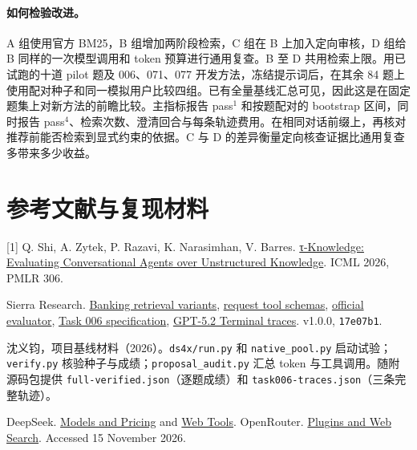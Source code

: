 \documentclass{article}
\begin{document}
\paragraph{如何检验改进。} A 组使用官方 BM25，B 组增加两阶段检索，C 组在 B 上加入定向审核，D 组给 B 同样的一次模型调用和 token 预算进行通用复查。B 至 D 共用检索上限。用已试跑的十道 pilot 题及 006、071、077 开发方法，冻结提示词后，在其余 84 题上使用配对种子和同一模拟用户比较四组。已有全量基线汇总可见，因此这是在固定题集上对新方法的前瞻比较。主指标报告 pass$^1$ 和按题配对的 bootstrap 区间，同时报告 pass$^4$、检索次数、澄清回合与每条轨迹费用。在相同对话前缀上，再核对推荐前能否检索到显式约束的依据。C 与 D 的差异衡量定向核查证据比通用复查多带来多少收益。
\section*{参考文献与复现材料}
\small
[1] Q. Shi, A. Zytek, P. Razavi, K. Narasimhan, V. Barres. \href{https://proceedings.mlr.press/v306/shi26ah.html}{τ-Knowledge: Evaluating Conversational Agents over Unstructured Knowledge}. ICML 2026, PMLR 306.\par
[2] Sierra Research. \href{https://github.com/sierra-research/tau2-bench/blob/17e07b1da2bbc0cadfddeea36412686e0604127b/src/tau2/domains/banking_knowledge/retrieval.py}{Banking retrieval variants}, \href{https://github.com/sierra-research/tau2-bench/blob/17e07b1da2bbc0cadfddeea36412686e0604127b/src/tau2/utils/llm_utils.py}{request tool schemas}, \href{https://github.com/sierra-research/tau2-bench/blob/17e07b1da2bbc0cadfddeea36412686e0604127b/src/tau2/evaluator/evaluator.py}{official evaluator}, \href{https://github.com/sierra-research/tau2-bench/blob/17e07b1da2bbc0cadfddeea36412686e0604127b/data/tau2/domains/banking_knowledge/tasks/task_006.json}{Task 006 specification}, \href{https://github.com/sierra-research/tau2-bench/blob/17e07b1da2bbc0cadfddeea36412686e0604127b/web/leaderboard/public/submissions/gpt-5-2_sierra_2026-02-26/trajectories/gpt-5.2_high_banking_knowledge_gpt-5.2_4trials.json}{GPT-5.2 Terminal traces}. v1.0.0, \texttt{17e07b1}.\par
[3] 沈义钧，项目基线材料（2026）。\texttt{ds4x/run.py} 和 \texttt{native\_pool.py} 启动试验；\texttt{verify.py} 核验种子与成绩；\texttt{proposal\_audit.py} 汇总 token 与工具调用。随附源码包提供 \texttt{full-verified.json}（逐题成绩）和 \texttt{task006-traces.json}（三条完整轨迹）。\par
[4] DeepSeek. \href{https://api-docs.deepseek.com/quick_start/pricing/}{Models and Pricing} and \href{https://api-docs.deepseek.com/guides/web_tools/}{Web Tools}. OpenRouter. \href{https://openrouter.ai/docs/guides/features/plugins/overview}{Plugins and Web Search}. Accessed 15 November 2026.\par
\end{document}
